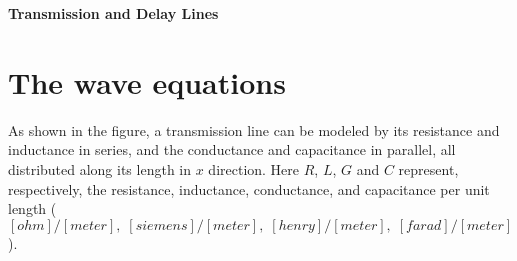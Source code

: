 \usepackage{html}


{\huge \bf Transmission and Delay Lines}


\section*{The wave equations}

As shown in the figure, a transmission line can be modeled by its 
resistance and inductance in series, and the conductance and capacitance
in parallel, all distributed along its length in $x$ direction. Here $R$,
$L$, $G$ and $C$ represent, respectively, the resistance, inductance, 
conductance, and capacitance per unit length
( $[ohm]/[meter],\;[siemens]/[meter],\;[henry]/[meter],\;[farad]/[meter] $).


